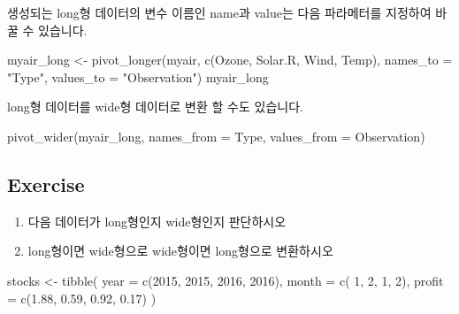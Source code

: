 \documentclass[
]{book}
\newenvironment{Shaded}{\begin{snugshade}}{\end{snugshade}}
\newcommand{\AttributeTok}[1]{\textcolor[rgb]{0.77,0.63,0.00}{#1}}
\newcommand{\DecValTok}[1]{\textcolor[rgb]{0.00,0.00,0.81}{#1}}
\newcommand{\FloatTok}[1]{\textcolor[rgb]{0.00,0.00,0.81}{#1}}
\newcommand{\FunctionTok}[1]{\textcolor[rgb]{0.00,0.00,0.00}{#1}}
\newcommand{\NormalTok}[1]{#1}
\newcommand{\OtherTok}[1]{\textcolor[rgb]{0.56,0.35,0.01}{#1}}
\newcommand{\StringTok}[1]{\textcolor[rgb]{0.31,0.60,0.02}{#1}}
\providecommand{\tightlist}{%
  \setlength{\itemsep}{0pt}\setlength{\parskip}{0pt}}
\begin{document}
생성되는 long형 데이터의 변수 이름인 name과 value는 다음 파라메터를 지정하여 바꿀 수 있습니다.

\begin{Shaded}
\begin{Highlighting}[]
\NormalTok{myair\_long }\OtherTok{\textless{}{-}} \FunctionTok{pivot\_longer}\NormalTok{(myair, }
                          \FunctionTok{c}\NormalTok{(Ozone, Solar.R, Wind, Temp), }
                          \AttributeTok{names\_to =} \StringTok{"Type"}\NormalTok{, }
                          \AttributeTok{values\_to =} \StringTok{"Observation"}\NormalTok{)}
\NormalTok{myair\_long }
\end{Highlighting}
\end{Shaded}

long형 데이터를 wide형 데이터로 변환 할 수도 있습니다.

\begin{Shaded}
\begin{Highlighting}[]
\FunctionTok{pivot\_wider}\NormalTok{(myair\_long, }\AttributeTok{names\_from =}\NormalTok{ Type, }\AttributeTok{values\_from =}\NormalTok{ Observation)}
\end{Highlighting}
\end{Shaded}

\hypertarget{ex7.3.1}{%
\subsection{Exercise}\label{ex7.3.1}}

\begin{enumerate}
\def\labelenumi{\arabic{enumi})}
\tightlist
\item
  다음 데이터가 long형인지 wide형인지 판단하시오\\
\item
  long형이면 wide형으로 wide형이면 long형으로 변환하시오
\end{enumerate}

\begin{Shaded}
\begin{Highlighting}[]
\NormalTok{stocks }\OtherTok{\textless{}{-}} \FunctionTok{tibble}\NormalTok{(}
  \AttributeTok{year   =} \FunctionTok{c}\NormalTok{(}\DecValTok{2015}\NormalTok{, }\DecValTok{2015}\NormalTok{, }\DecValTok{2016}\NormalTok{, }\DecValTok{2016}\NormalTok{),}
  \AttributeTok{month  =} \FunctionTok{c}\NormalTok{(   }\DecValTok{1}\NormalTok{,    }\DecValTok{2}\NormalTok{,     }\DecValTok{1}\NormalTok{,    }\DecValTok{2}\NormalTok{),}
  \AttributeTok{profit =} \FunctionTok{c}\NormalTok{(}\FloatTok{1.88}\NormalTok{, }\FloatTok{0.59}\NormalTok{, }\FloatTok{0.92}\NormalTok{, }\FloatTok{0.17}\NormalTok{)}
\NormalTok{)}
\end{Highlighting}
\end{Shaded}
\end{document}
